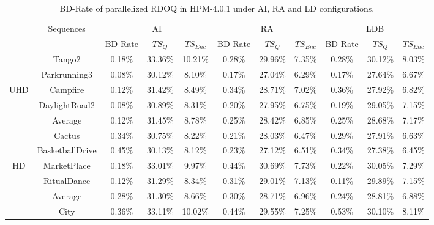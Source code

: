 \documentclass[lettersize,journal]{IEEEtran}
\begin{document}
\begin{table}[!h]
	\caption{BD-Rate of parallelized RDOQ in HPM-4.0.1 under AI, RA and LD configurations.}
    \label{tab:BD-Rate}
	\centering
	\tabcolsep 8pt  %
	\arrayrulewidth 0.75pt
	\begin{tabular}{c | c | c   c   c | c   c   c | c   c   c } 
		\midrule[0.75pt] \specialrule{0em}{0.35pt}{0.35pt} \midrule[0.75pt] %
		\multirow{2}{*}{Class} & \multirow{2}{*}{Sequences} & \multicolumn{3}{c|}{AI} & \multicolumn{3}{c|}{RA} & \multicolumn{3}{c}{LDB} \\ 
		\cmidrule[0.75pt]{3-11} 
		       &                & BD-Rate & $TS_{Q}$ & $TS_{Enc}$ & BD-Rate & $TS_{Q}$ & $TS_{Enc}$ & BD-Rate & $ TS_{Q}$ & $TS_{Enc}$  \\   
		\cmidrule[0.75pt]{1-11}  
		       & Tango2         & 0.18\% & 33.36\% &10.21\% & 0.28\% & 29.96\% & 7.35\% & 0.28\% & 30.12\% & 8.03\% \\ 
		       & Parkrunning3   & 0.08\% & 30.12\% & 8.10\% & 0.17\% & 27.04\% & 6.29\% & 0.17\% & 27.64\% & 6.67\% \\  
		   UHD & Campfire       & 0.12\% & 31.42\% & 8.49\% & 0.34\% & 28.71\% & 7.02\% & 0.36\% & 27.92\% & 6.82\% \\           
	           & DaylightRoad2  & 0.08\% & 30.89\% & 8.31\% & 0.20\% & 27.95\% & 6.75\% & 0.19\% & 29.05\% & 7.15\% \\   
	    \cmidrule[0.75pt]{2-11} 
	           & Average        & 0.12\% & 31.45\% & 8.78\% & 0.25\% & 28.42\% & 6.85\% & 0.25\% & 28.68\% & 7.17\% \\ 
	    \cmidrule[0.75pt]{1-11}  
	           & Cactus         & 0.34\% & 30.75\% & 8.22\% & 0.21\% & 28.03\% & 6.47\% & 0.29\% & 27.91\% & 6.63\% \\          
	           & BasketballDrive& 0.45\% & 30.13\% & 8.12\% & 0.23\% & 27.12\% & 6.51\% & 0.34\% & 27.38\% & 6.45\% \\  
	      HD   & MarketPlace    & 0.18\% & 33.01\% & 9.97\% & 0.44\% & 30.69\% & 7.73\% & 0.22\% & 30.05\% & 7.29\% \\                    
	           & RitualDance    & 0.12\% & 31.29\% & 8.34\% & 0.31\% & 29.01\% & 7.13\% & 0.11\% & 29.89\% & 7.15\% \\   
	    \cmidrule[0.75pt]{2-11} 
	           & Average        & 0.28\% & 31.30\% & 8.66\% & 0.30\% & 28.71\% & 6.96\% & 0.24\% & 28.81\% & 6.88\% \\ 
	    \cmidrule[0.75pt]{1-11}  
	           & City           & 0.36\% & 33.11\% &10.02\% & 0.44\% & 29.55\% & 7.25\% & 0.53\% & 30.10\% & 8.11\% \\          

\end{tabular}
\end{table}
\end{document}
